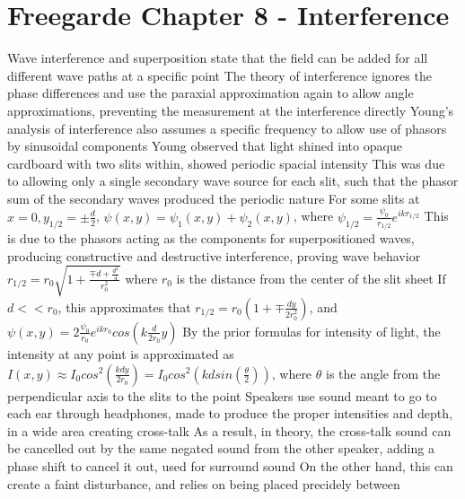 \documentclass[11 pt, twoside]{article}
\newenvironment{outline*}
{
	\begin{outline}[enumerate]
	}
	{\end{outline}
}
\begin{document}
\section{Freegarde Chapter 8 - Interference}
\begin{outline*}
\1 Wave interference and superposition state that the field can be added for all different wave paths at a specific point
\2 The theory of interference ignores the phase differences and use the paraxial approximation again to allow angle approximations, preventing the measurement at the interference directly
\2 Young's analysis of interference also assumes a specific frequency to allow use of phasors by sinusoidal components
\1 Young observed that light shined into opaque cardboard with two slits within, showed periodic spacial intensity
\2 This was due to allowing only a single secondary wave source for each slit, such that the phasor sum of the secondary waves produced the periodic nature
\2 For some slits at $x = 0, y_{1/2} = \pm \frac{d}{2}$, $\psi(x,y) = \psi_1(x,y) + \psi_2(x,y)$, where $\psi_{1/2} = \frac{\psi_0}{r_{1/2}}e^{ikr_{1/2}}$
\3 This is due to the phasors acting as the components for superpositioned waves, producing constructive and destructive interference, proving wave behavior
\3 $r_{1/2} = r_0\sqrt{1 + \frac{\mp d + \frac{d^2}{4}}{r_0^2}}$ where $r_0$ is the distance from the center of the slit sheet
\4 If $d << r_0$, this approximates that $r_{1/2} = r_0(1 + \mp \frac{dy}{2r^2_0})$, and $\psi(x, y) = 2\frac{\psi_0}{r_0}e^{ikr_0}cos(k\frac{d}{2r_0}y)$
\4 By the prior formulas for intensity of light, the intensity at any point is approximated as $I(x, y) \approx I_0cos^2(\frac{kdy}{2r_0}) = I_0cos^2(kdsin(\frac{\theta}{2}))$, where $\theta$ is the angle from the perpendicular axis to the slits to the point
\1 Speakers use sound meant to go to each ear through headphones, made to produce the proper intensities and depth, in a wide area creating cross-talk
\2 As a result, in theory, the cross-talk sound can be cancelled out by the same negated sound from the other speaker, adding a phase shift to cancel it out, used for surround sound
\2 On the other hand, this can create a faint disturbance, and relies on being placed precidely between
\end{outline*}
\end{document}
